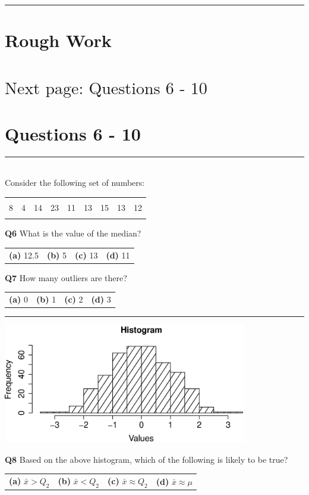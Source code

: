\documentclass[12pt]{article}
\begin{document}
\rule{\linewidth}{1pt}

\newpage

\section*{Rough Work\\[23cm]}
\section*{\hspace{8cm}$\boxed{\text{Next page: Questions 6 - 10}}$}

\newpage


\section*{Questions 6 - 10}

\rule{\linewidth}{1pt}
\quad\\
Consider the following set of numbers:
\begin{center}
\begin{tabular}{|ccccccccc|}
\hline
&&&&&&&&\\[-0.4cm]
8 & 4 & 14 & 23 & 11 & 13 & 15 & 13 & 12 \\
\hline
\multicolumn{9}{c}{}
\end{tabular}
\end{center}

{\bf Q6} What is the value of the median?\\[0.2cm]
\begin{tabular}{cccc}
{\bf(a)} 12.5 & {\bf(b)} 5 & {\bf(c)} 13 & {\bf(d)} 11 \\[0.6cm]
\end{tabular}

{\bf Q7} How many outliers are there?\\[0.2cm]
\begin{tabular}{cccc}
{\bf(a)} 0 & {\bf(b)} 1 & {\bf(c)} 2 & {\bf(d)} 3 \\[0.6cm]
\end{tabular}


\rule{\linewidth}{1pt}
\begin{center}
\includegraphics[width=0.8\textwidth, trim = 0.0cm 0.6cm 1.5cm 0.8cm, clip]{Hist}
\end{center}
{\bf Q8} Based on the above histogram, which of the following is likely to be true?\\[0.2cm]
\begin{tabular}{cccc}
{\bf(a)} $\bar x > Q_2$ & {\bf(b)} $\bar x < Q_2$ & {\bf(c)} $\bar x \approx Q_2$  & {\bf(d)} $\bar x \approx \mu$ \\[0.6cm]
\end{tabular}
\end{document}
